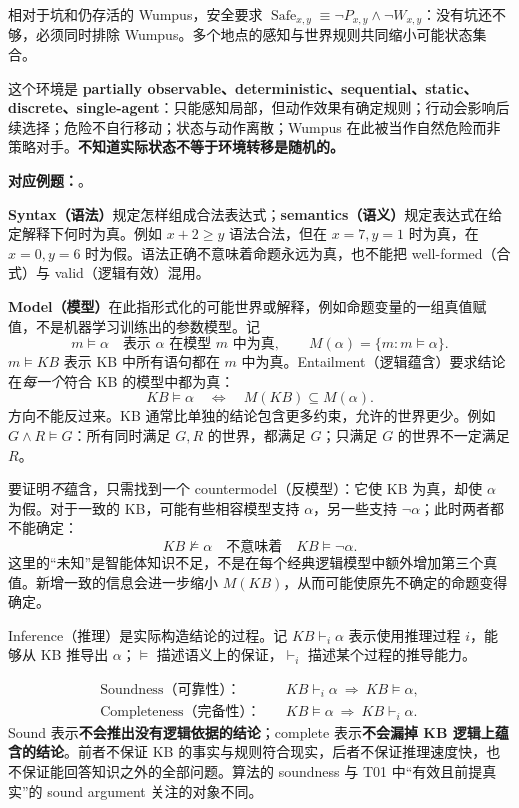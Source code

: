 相对于坑和仍存活的 Wumpus，安全要求 $\operatorname{Safe}_{x,y}\equiv\neg P_{x,y}\land\neg W_{x,y}$：没有坑还不够，必须同时排除 Wumpus。多个地点的感知与世界规则共同缩小可能状态集合。

这个环境是 \textbf{partially observable、deterministic、sequential、static、discrete、single-agent}：只能感知局部，但动作效果有确定规则；行动会影响后续选择；危险不自行移动；状态与动作离散；Wumpus 在此被当作自然危险而非策略对手。\textbf{不知道实际状态不等于环境转移是随机的。}

\textbf{对应例题：}。


\textbf{Syntax（语法）}规定怎样组成合法表达式；\textbf{semantics（语义）}规定表达式在给定解释下何时为真。例如 $x+2\ge y$ 语法合法，但在 $x=7,y=1$ 时为真，在 $x=0,y=6$ 时为假。语法正确不意味着命题永远为真，也不能把 well-formed（合式）与 valid（逻辑有效）混用。

\textbf{Model（模型）}在此指形式化的可能世界或解释，例如命题变量的一组真值赋值，不是机器学习训练出的参数模型。记
\[
  m\models\alpha\quad\text{表示 $\alpha$ 在模型 $m$ 中为真},
  \qquad M(\alpha)=\{m:m\models\alpha\}.
\]
$m\models KB$ 表示 KB 中所有语句都在 $m$ 中为真。Entailment（逻辑蕴含）要求结论在\emph{每一个}符合 KB 的模型中都为真：
\[
  \boxed{KB\models\alpha
    \quad\Longleftrightarrow\quad
    M(KB)\subseteq M(\alpha)}.
\]
方向不能反过来。KB 通常比单独的结论包含更多约束，允许的世界更少。例如 $G\land R\models G$：所有同时满足 $G,R$ 的世界，都满足 $G$；只满足 $G$ 的世界不一定满足 $R$。

要证明\emph{不}蕴含，只需找到一个 countermodel（反模型）：它使 KB 为真，却使 $\alpha$ 为假。对于一致的 KB，可能有些相容模型支持 $\alpha$，另一些支持 $\neg\alpha$；此时两者都不能确定：
\[
  KB\not\models\alpha\quad\text{不意味着}\quad KB\models\neg\alpha.
\]
这里的“未知”是智能体知识不足，不是在每个经典逻辑模型中额外增加第三个真值。新增一致的信息会进一步缩小 $M(KB)$，从而可能使原先不确定的命题变得确定。


Inference（推理）是实际构造结论的过程。记 $KB\vdash_i\alpha$ 表示使用推理过程 $i$，能够从 KB 推导出 $\alpha$；$\models$ 描述语义上的保证，$\vdash_i$ 描述某个过程的推导能力。

\begin{align*}
  \text{Soundness（可靠性）：}\quad
  &KB\vdash_i\alpha\ \Longrightarrow\ KB\models\alpha,\\
  \text{Completeness（完备性）：}\quad
  &KB\models\alpha\ \Longrightarrow\ KB\vdash_i\alpha.
\end{align*}
Sound 表示\textbf{不会推出没有逻辑依据的结论}；complete 表示\textbf{不会漏掉 KB 逻辑上蕴含的结论}。前者不保证 KB 的事实与规则符合现实，后者不保证推理速度快，也不保证能回答知识之外的全部问题。算法的 soundness 与 T01 中“有效且前提真实”的 sound argument 关注的对象不同。

